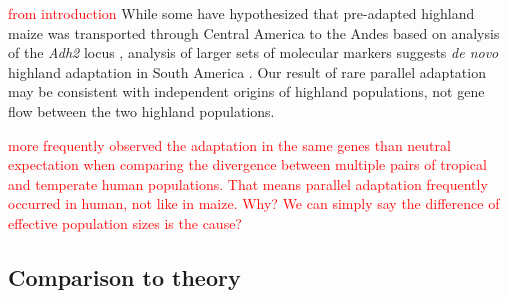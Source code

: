 {{\textcolor{red}{from introduction}
While some have hypothesized that pre-adapted highland maize was transported through Central America to the Andes based on analysis of the \emph{Adh2} locus \cite[]{Freitas_2003_68}, analysis of larger sets of molecular markers suggests \emph{de novo} highland adaptation in South America \cite[]{Vigouroux_2008_21632329,vanHeerwaarden_2011_21189301}.  Our result of rare parallel adaptation may be consistent with independent origins of highland populations, not gene flow between the two highland populations.

\textcolor{red}{\cite{Tennessen_2011_21698142} more frequently observed the adaptation in the same genes than neutral expectation when comparing the divergence between multiple pairs of tropical and temperate human populations.  That means parallel adaptation frequently occurred in human, not like in maize.
Why?  We can simply say the difference of effective population sizes is the cause?}





\subsection*{Comparison to theory}

}}
